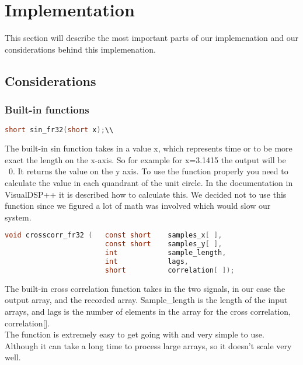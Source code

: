 \chapter{Implementation}
This section will describe the most important parts of our implemenation and our considerations behind this implemenation.\\
\section{Considerations}
\subsection{Built-in functions}
\begin{lstlisting}[language=C]
short sin_fr32(short x);\\
\end{lstlisting}
The built-in sin function takes in a value x, which represents time or to be more exact the length on the x-axis. So for example for x=3.1415 the output will be ~0. It returns the value on the y axis. To use the function properly you need to calculate the value in each quandrant of the unit circle. In the documentation in VisualDSP++ it is described how to calculate this. We decided not to use this function since we figured a lot of math was involved which would slow our system.

\begin{lstlisting}[language=C]
void crosscorr_fr32 (	const short    samples_x[ ], 
                     	const short    samples_y[ ],
                     	int            sample_length,
                     	int            lags,
                     	short          correlation[ ]);
\end{lstlisting}
The built-in cross correlation function takes in the two signals, in our case the output array, and the recorded array. Sample\_length is the length of the input arrays, and lags is the number of elements in the array for the cross correlation, correlation[].\\
The function is extremely easy to get going with and very simple to use. Although it can take a long time to process large arrays, so it doesn't scale very well.\\
